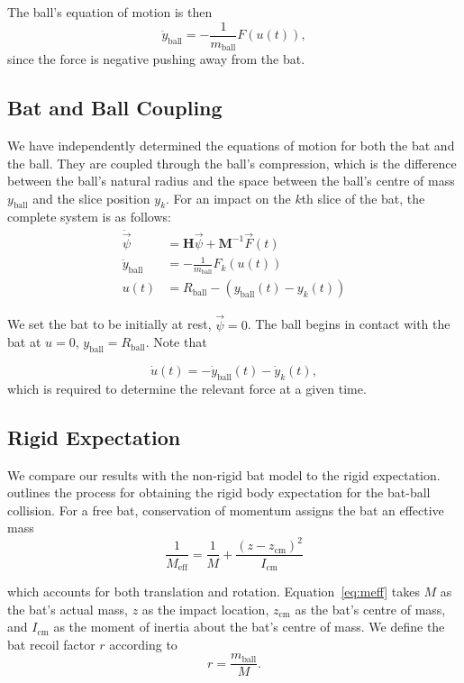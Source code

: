 \documentclass[linenumbers]{aastex7}
\newcommand{\ball}{_\mathrm{ball}}
\begin{document}
The ball's equation of motion is then
\begin{equation}
	\ddot{y}\ball = - \frac{1}{m\ball}F(u(t)),
\end{equation}
since the force is negative pushing away from the bat.
\subsection{Bat and Ball Coupling}

We have independently determined the equations of motion for both the bat and the ball. They are coupled through the ball's compression, which is the difference between the ball's natural radius and the space between the ball's centre of mass $y\ball$ and the slice position $y_k$. For an impact on the $k$th slice of the bat, the complete system is as follows:
\begin{align}
	\ddot{\vec{\psi}} & = \mathbf{H} \vec{\psi} + \mathbf{M}^{-1} \vec{F}(t) \\
	\ddot{y}\ball     & = - \frac{1}{m\ball}F_k(u(t))                        \\
	u(t)              & = R\ball - (y\ball(t) - y_k(t))
\end{align}

We set the bat to be initially at rest, $\vec{\psi} = 0$. The ball begins in contact with the bat at $u = 0$, $y\ball = R\ball$. Note that

\begin{equation}
	\dot{u}(t) = - \dot{y}\ball(t) - \dot{y}_k(t),
\end{equation}
which is required to determine the relevant force at a given time.


\subsection{Rigid Expectation}
We compare our results with the non-rigid bat model to the rigid expectation. \cite{nathanCharacterizingPerformanceBaseball2003} outlines the process for obtaining the rigid body expectation for the bat-ball collision. For a free bat, conservation of momentum assigns the bat an effective mass
\begin{equation}\label{eq:meff}
	\frac{1}{M_\mathrm{eff}} = \frac{1}{M} + \frac{(z - z_\mathrm{cm})^2}{I_\mathrm{cm}} 
\end{equation}

which accounts for both translation and rotation. Equation~\ref{eq:meff} takes $M$ as the bat's actual mass, $z$ as the impact location, $z_\mathrm{cm}$ as the bat's centre of mass, and $I_\mathrm{cm}$ as the moment of inertia about the bat's centre of mass. We define the bat recoil factor $r$ according to
\begin{equation}
	r = \frac{m\ball}{M}.
\end{equation}
\end{document}

